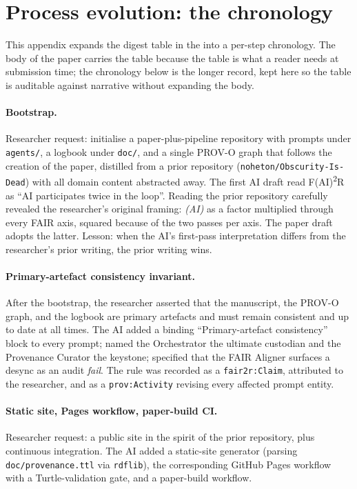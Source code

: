\section{Process evolution: the chronology}
\label{sec:appendix-evolution}

This appendix expands the digest table in the
 into a per-step
chronology. The body of the paper carries the table because the
table is what a reader needs at submission time; the chronology
below is the longer record, kept here so the table is auditable
against narrative without expanding the body.


\paragraph{Bootstrap.}
Researcher request: initialise a paper-plus-pipeline repository with
prompts under \texttt{agents/}, a logbook under \texttt{doc/}, and a
single PROV-O graph that follows the creation of the paper, distilled
from a prior repository (\texttt{noheton/Obscurity-Is-Dead}) with all
domain content abstracted away. The first AI draft read
F(AI)\textsuperscript{2}R as ``AI participates twice in the loop''.
Reading the prior repository carefully revealed the researcher's
original framing: \emph{(AI)} as a factor multiplied through every
FAIR axis, squared because of the two passes per axis. The paper
draft adopts the latter. Lesson: when the AI's first-pass
interpretation differs from the researcher's prior writing, the prior
writing wins.

\paragraph{Primary-artefact consistency invariant.}
After the bootstrap, the researcher asserted that the manuscript,
the PROV-O graph, and the logbook are primary artefacts and must
remain consistent and up to date at all times. The AI added a
binding ``Primary-artefact consistency'' block to every prompt;
named the Orchestrator the ultimate custodian and the Provenance
Curator the keystone; specified that the FAIR Aligner surfaces a
desync as an audit \emph{fail}. The rule was recorded as a
\texttt{fair2r:Claim}, attributed to the researcher, and as a
\texttt{prov:Activity} revising every affected prompt entity.

\paragraph{Static site, Pages workflow, paper-build CI.}
Researcher request: a public site in the spirit of the prior
repository, plus continuous integration. The AI added a static-site
generator (parsing \texttt{doc/provenance.ttl} via \texttt{rdflib}),
the corresponding GitHub Pages workflow with a Turtle-validation
gate, and a paper-build workflow.

